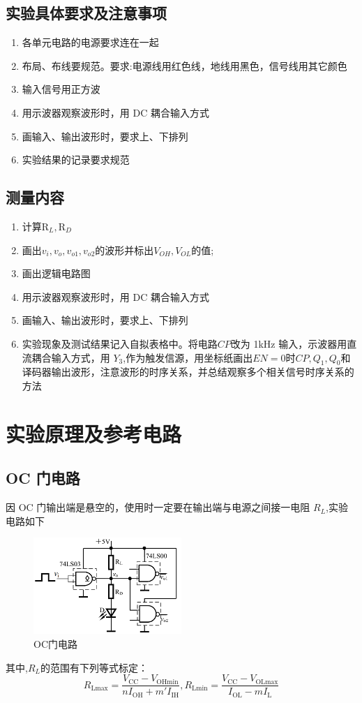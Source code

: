 \documentclass[a4paper,11pt,UTF8]{article}
\begin{document}
\subsection{实验具体要求及注意事项}
\begin{enumerate}
	\item 各单元电路的电源要求连在一起
	\item 布局、布线要规范。要求:电源线用红色线，地线用黑色，信号线用其它颜色
	\item 输入信号用正方波
	\item 用示波器观察波形时，用 DC 耦合输入方式
	\item 画输入、输出波形时，要求上、下排列
	\item 实验结果的记录要求规范
\end{enumerate}
\subsection{测量内容}
\begin{enumerate}
	\item 计算$\mathrm{R}_L, \mathrm{R}_D$
	\item 画出$v_i,v_o,v_{o1},v_{o2}$的波形并标出$ V_{OH}, V_{OL}$的值;
	\item 画出逻辑电路图
	\item 用示波器观察波形时，用 DC 耦合输入方式
	\item 画输入、输出波形时，要求上、下排列
	\item 实验现象及测试结果记入自拟表格中。将电路$CP$改为 1kHz 输入，示波器用直流耦合输入方式，用 $Y_3$,作为触发信源，用坐标纸画出$EN=0$时$CP, Q_1,Q_0$和译码器输出波形，注意波形的时序关系，并总结观察多个相关信号时序关系的方法
\end{enumerate}
\section{实验原理及参考电路}
\subsection{OC 门电路}
因 OC 门输出端是悬空的，使用时一定要在输出端与电源之间接一电阻 $R_L$,实验电路如下
\begin{figure}[!ht]
	\centering
	\includegraphics[width=0.5\textwidth]{OC}
	\caption{OC门电路}
\end{figure}
其中,$R_L$的范围有下列等式标定：
$$
R_{\mathrm{Lmax}}=\frac{V_{\mathrm{CC}}-V_{\mathrm{OHmin}}}{nI_{\mathrm{OH}}+m'I_{\mathrm{IH}}},R_{\mathrm{Lmin}}=\frac{V_{\mathrm{CC}}-V_{\mathrm{OLmax}}}{I_{\mathrm{OL}}-mI_{\mathrm{L}}}
$$
\end{document}
